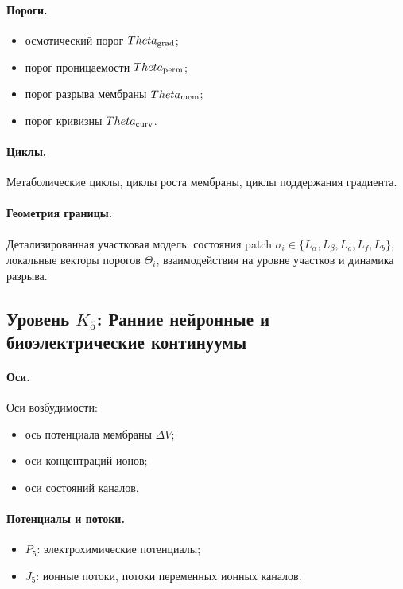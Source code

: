 \paragraph{Пороги.}
\begin{itemize}
    \item осмотический порог \(\Theta_{\rm grad}\);
    \item порог проницаемости \(\Theta_{\rm perm}\);
    \item порог разрыва мембраны \(\Theta_{\rm mem}\);
    \item порог кривизны \(\Theta_{\rm curv}\).
\end{itemize}

\paragraph{Циклы.}
Метаболические циклы, циклы роста мембраны, циклы поддержания градиента.

\paragraph{Геометрия границы.}
Детализированная участковая модель:
состояния patch \(\sigma_i\in\{L_\alpha,L_\beta,L_o,L_f,L_b\}\),
локальные векторы порогов \(\Theta_i\),
взаимодействия на уровне участков и динамика разрыва.


\subsection{Уровень \texorpdfstring{\texorpdfstring{$K_5$}{K\_5}}{K5}: Ранние нейронные и биоэлектрические континуумы}

\paragraph{Оси.}
Оси возбудимости:
\begin{itemize}
    \item ось потенциала мембраны \(\Delta V\);
    \item оси концентраций ионов;
    \item оси состояний каналов.
\end{itemize}

\paragraph{Потенциалы и потоки.}
\begin{itemize}
    \item \(P_5\): электрохимические потенциалы;
    \item \(J_5\): ионные потоки, потоки переменных ионных каналов.
\end{itemize}


